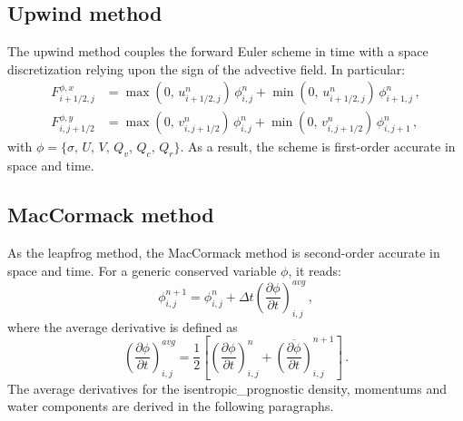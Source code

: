 \documentclass{article}
\numberwithin{equation}{section}
\begin{document}
	\subsection{Upwind method}
	\label{section:Upwind method}
		The upwind method couples the forward Euler scheme in time with a space discretization relying upon the sign of the advective field. In particular:
		\begin{subequations}
			\begin{align}
				F_{i+1/2,j}^{\phi,x} & = \max \left( 0, \, u_{i+1/2,j}^n \right) \, \phi_{i,j}^n + \min \left( 0, \, u_{i+1/2,j}^n \right) \, \phi_{i+1,j}^n \, , \\
				F_{i,j+1/2}^{\phi,y} & = \max \left( 0, \, v_{i,j+1/2}^n \right) \, \phi_{i,j}^n + \min \left( 0, \, v_{i,j+1/2}^n \right) \, \phi_{i,j+1}^n \, ,
			\end{align}
		\end{subequations}
		with $\phi = \lbrace \sigma, \, U, \, V, \, Q_v, \, Q_c, \, Q_r \rbrace$. As a result, the scheme is first-order accurate in space and time.
		
	\subsection{MacCormack method}
	\label{section:MacCormack method}
		As the leapfrog method, the MacCormack method is second-order accurate in space and time. For a generic conserved variable $\phi$, it reads:
		\begin{equation}
			\label{eq:mc}
			\phi_{i,j}^{n+1} = \phi_{i,j}^n + \Delta t \left( \dfrac{\partial \phi}{\partial t} \right)_{i,j}^{avg} \, ,
		\end{equation}
		where the average derivative is defined as
		\begin{equation}
			\label{eq:average-derivative}
			\left( \dfrac{\partial \phi}{\partial t} \right)_{i,j}^{avg} = \dfrac{1}{2} \left[ \left( \dfrac{\partial \phi}{\partial t} \right)_{i,j}^n + \overline{\left( \dfrac{\partial \phi}{\partial t} \right)}_{i,j}^{n+1} \right] \, .
		\end{equation}
		The average derivatives for the isentropic_prognostic density, momentums and water components are derived in the following paragraphs.
\end{document}
